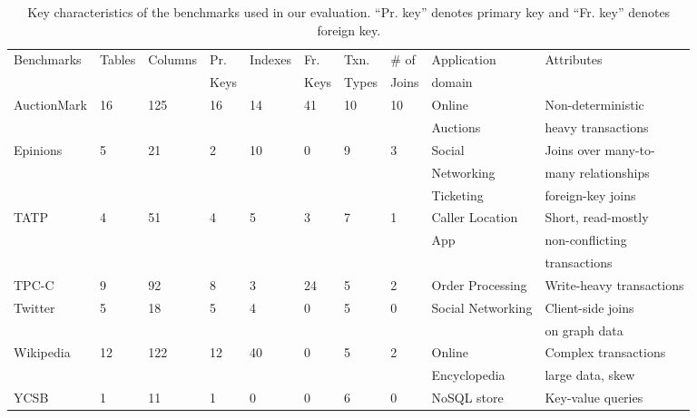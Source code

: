 \begin{table*}[ht!]
  \centering
  \begin{adjustbox}{max width=\textwidth}
  \begin{tabular}{l|lllllllll} \toprule
   Benchmarks & Tables & Columns & Pr. & Indexes &	Fr. &
   Txn. & \# of & Application  & Attributes  \\
   & & & Keys & & Keys & Types & Joins  & domain & \\
   \midrule
	AuctionMark 	& 16 	& 125  &	16 &	14 &	41 &	10 &	10 &	Online &
	Non-deterministic\\
	& & & & & & & & Auctions &  heavy transactions \\
	Epinions 		& 5 	& 21   & 	2  &	10 &	 0 & 	9  &	3  &	Social  & Joins over
	many-to- \\
	& & & & & & & & Networking & many relationships  \\
	& & & & & & & & Ticketing & foreign-key joins \\
	TATP &	4 	& 51 &	4 &	5 &	3 &	7 &	1 &	Caller Location  &	Short, read-mostly\\
	& & & & & & & & App & non-conflicting\\
	& & & & & & & & &  transactions\\
	TPC-C &	9 &	92 &	8 &	3 &	24 &	5 &	2 &	Order Processing & Write-heavy
	transactions\\
	Twitter &	5 &	18 &	5 &	4 &	0 &	5 &	0 &	Social Networking & Client-side joins \\
	& & & & & & & & & on	graph data \\
	Wikipedia &	12 &	122 &	12 &	40 &	0 &	5 &	2 &	Online &	Complex	transactions \\
	& & & & & & & & Encyclopedia & large data, skew  \\
	YCSB &	1 &	11 &	1 &	0 &	0 &	6 &	0 &	NoSQL store &	Key-value queries \\
   \bottomrule
   \end{tabular}
   \end{adjustbox}
\caption{Key characteristics of the benchmarks used in our evaluation. ``Pr. key''
denotes primary key and ``Fr. key'' denotes foreign key.}
\label{tab:benchmarks}
\end{table*}
